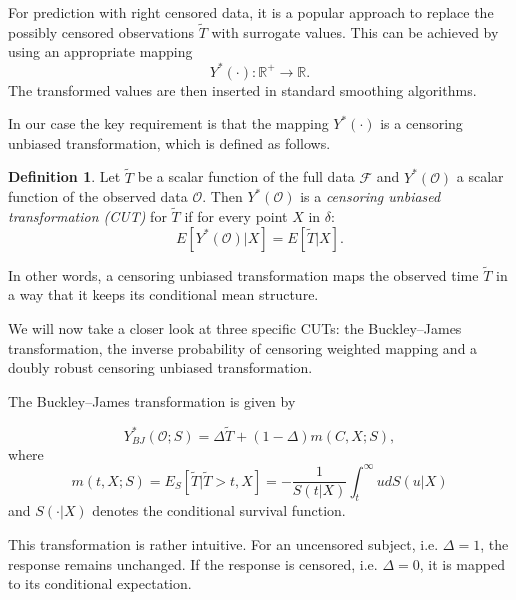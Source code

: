 \documentclass[12pt, a4paper]{scrartcl}
\theoremstyle{definition}
\newtheorem{Definition}{Definition}[section]
\theoremstyle{plain}
\numberwithin{equation}{section}
\numberwithin{figure}{section}
\numberwithin{table}{section}
\begin{document}
	
	For prediction with right censored data, it is a popular approach to replace the possibly censored observations $\tilde T$ with surrogate values.
	This can be achieved by using an appropriate mapping $$Y^*(\cdot): \mathbb{R}^+ \to \mathbb{R}.$$
	The transformed values are then inserted in standard smoothing algorithms.
	
	In our case the key requirement is that the mapping $Y^*(\cdot)$ is a censoring unbiased transformation, which is defined as follows.
	
	\begin{Definition}
	Let $\tilde T$ be a scalar function of the full data $\mathcal{F}$ and $Y^*(\mathcal{O})$ a scalar function of the observed data $\mathcal{O}$.
	Then $Y^*(\mathcal{O})$ is a \textit{censoring unbiased transformation (CUT)} for $\tilde T$ if for every point $X$ in $\delta$:
	\begin{equation*}
	E[Y^*(\mathcal{O}) \vert X] = E[\tilde T \vert X].
	\end{equation*}
	\end{Definition}

	In other words, a censoring unbiased transformation maps the observed time $\tilde T$ in a way that it keeps its conditional mean structure.
	
	We will now take a closer look at three specific CUTs: the Buckley--James transformation, the inverse probability of censoring weighted mapping and a doubly robust censoring unbiased transformation.
	
	The Buckley--James transformation is given by
	
	\begin{equation}\label{eq:bjtrafo}
		Y_{BJ}^* (\mathcal{O}; S) = \Delta \tilde{T} + (1-\Delta)m(C,X;S),
	\end{equation}
	where
	\begin{equation}\label{eq:condmean}
		m(t,X;S) = E_S[\tilde{T} \vert \tilde T > t, X] = -\frac{1}{S(t\vert X)} \int_t^{\infty} u dS(u\vert X)
	\end{equation}%
	and $S(\cdot\vert X)$ denotes the conditional survival function.
	
	
	This transformation is rather intuitive.
	For an uncensored subject, i.e. $\Delta = 1$, the response remains unchanged.
	If the response is censored, i.e. $\Delta = 0$, it is mapped to its conditional expectation. %
	
\end{document}
